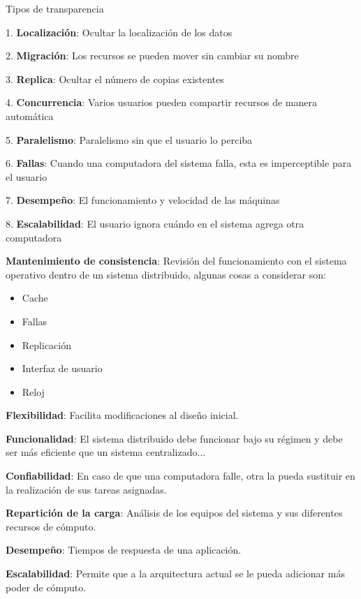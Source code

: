 {\raggedright
Tipos de transparencia
}

1. \textbf{Localización}: Ocultar la localización de los datos

2. \textbf{Migración}: Los recursos se pueden mover sin cambiar su nombre

3. \textbf{Replica}: Ocultar el número de copias existentes

4. \textbf{Concurrencia}: Varios usuarios pueden compartir recursos de manera automática

5. \textbf{Paralelismo}: Paralelismo sin que el usuario lo perciba

6. \textbf{Fallas}: Cuando una computadora del sistema falla, esta es imperceptible para el usuario

7. \textbf{Desempeño}: El funcionamiento y velocidad de las máquinas

8. \textbf{Escalabilidad}: El usuario ignora cuándo en el sistema agrega otra computadora

\vspace{1cm}

\textbf{Mantenimiento de consistencia}: Revisión del funcionamiento con el sistema operativo dentro de un sistema distribuido, algunas cosas a considerar son:

\begin{itemize}
	\item Cache
	\item Fallas
	\item Replicación
	\item Interfaz de usuario
	\item Reloj
\end{itemize}

\textbf{Flexibilidad}: Facilita modificaciones al diseño inicial.\hfill \break

\textbf{Funcionalidad}: El sistema distribuido debe funcionar bajo su régimen y debe ser más eficiente que un sistema centralizado...\hfill \break

\textbf{Confiabilidad}: En caso de que una computadora falle, otra la pueda sustituir en la realización de sus tareas asignadas.\hfill \break

\textbf{Repartición de la carga}: Análisis de los equipos del sistema y sus diferentes recursos de cómputo.\hfill \break

\textbf{Desempeño}: Tiempos de respuesta de una aplicación.\hfill \break

\textbf{Escalabilidad}: Permite que a la arquitectura actual se le pueda adicionar más poder de cómputo.

